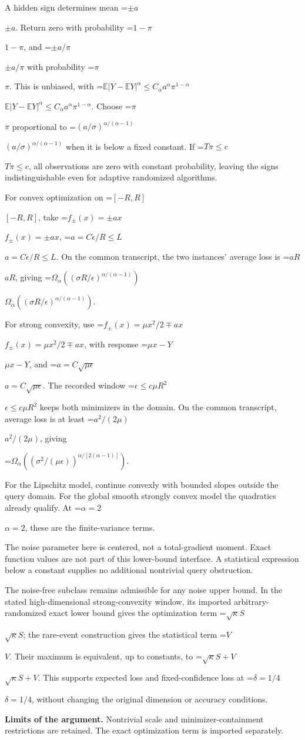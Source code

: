 \documentclass[10pt,a4paper]{article}
\newcommand{\AtlasMath}[1]{\par\begingroup\centering\setbox0=\hbox{$\displaystyle #1$}\ifdim\wd0>1.4\linewidth\typeout{ATLAS WIDE FORMULA: \the\wd0}\fi\ifdim\wd0>\linewidth\resizebox{\linewidth}{!}{\box0}\else\box0\fi\par\endgroup}
\newcommand{\AtlasInlineMath}[1]{\begingroup\setbox0=\hbox{$#1$}\ifdim\wd0>.4\linewidth\endgroup\AtlasMath{#1}\else\endgroup$#1$\fi}
\begin{document}
A hidden sign determines mean \AtlasInlineMath{\pm a}. Return zero with probability \AtlasInlineMath{1-\pi}, and \AtlasInlineMath{\pm a/\pi} with probability \AtlasInlineMath{\pi}. This is unbiased, with
\AtlasInlineMath{\mathbb E|Y-\mathbb EY|^\alpha\le C_\alpha a^\alpha\pi^{1-\alpha}}.
Choose \AtlasInlineMath{\pi} proportional to \AtlasInlineMath{(a/\sigma)^{\alpha/(\alpha-1)}} when it is below a fixed constant. If \AtlasInlineMath{T\pi\le c}, all observations are zero with constant probability, leaving the signs indistinguishable even for adaptive randomized algorithms.

For convex optimization on \AtlasInlineMath{[-R,R]}, take \AtlasInlineMath{f_\pm(x)=\pm ax}, \AtlasInlineMath{a=C\epsilon/R\le L}. On the common transcript, the two instances' average loss is \AtlasInlineMath{aR}, giving
\AtlasInlineMath{\Omega_\alpha((\sigma R/\epsilon)^{\alpha/(\alpha-1)})}.

For strong convexity, use \AtlasInlineMath{f_\pm(x)=\mu x^2/2\mp ax}, with response \AtlasInlineMath{\mu x-Y}, and \AtlasInlineMath{a=C\sqrt{\mu\epsilon}}. The recorded window \AtlasInlineMath{\epsilon\le c\mu R^2} keeps both minimizers in the domain. On the common transcript, average loss is at least \AtlasInlineMath{a^2/(2\mu)}, giving

\AtlasMath{\Omega_\alpha((\sigma^2/(\mu\epsilon))^{\alpha/[2(\alpha-1)]}).}

For the Lipschitz model, continue convexly with bounded slopes outside the query domain. For the global smooth strongly convex model the quadratics already qualify. At \AtlasInlineMath{\alpha=2}, these are the finite-variance terms.

The noise parameter here is centered, not a total-gradient moment. Exact function values are not part of this lower-bound interface. A statistical expression below a constant supplies no additional nontrivial query obstruction.

The noise-free subclass remains admissible for any noise upper bound. In the stated high-dimensional strong-convexity window, its imported arbitrary-randomized exact lower bound gives the optimization term \AtlasInlineMath{\sqrt\kappa S}; the rare-event construction gives the statistical term \AtlasInlineMath{V}. Their maximum is equivalent, up to constants, to \AtlasInlineMath{\sqrt\kappa S+V}. This supports expected loss and fixed-confidence loss at \AtlasInlineMath{\delta=1/4}, without changing the original dimension or accuracy conditions.

\textbf{Limits of the argument.} Nontrivial scale and minimizer-containment restrictions are retained. The exact optimization term is imported separately.
\end{document}
